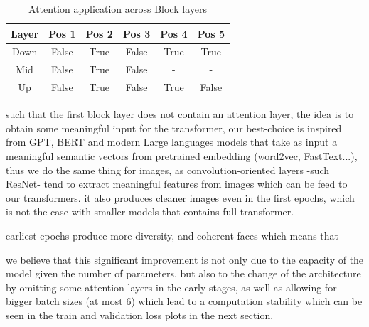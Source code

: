 \documentclass[twocolumn,superscriptaddress,aps]{revtex4-1}
\begin{document}
\begin{table}[h!]
\centering
\begin{tabular}{|c|c|c|c|c|c|}
\hline
\textbf{Layer} & \textbf{Pos 1} & \textbf{Pos 2} & \textbf{Pos 3} & \textbf{Pos 4} & \textbf{Pos 5} \\
\hline
Down & False & True & False & True & True \\
Mid  & False & True & False &   -  &  -  \\
Up   & False & True & False & True & False \\
\hline
\end{tabular}
\caption{Attention application across Block layers}
\end{table}
such that the first block layer does not contain an attention layer, the idea is to obtain some meaningful input for the transformer, our best-choice is inspired from GPT, BERT and modern Large languages models that take as input a meaningful semantic vectors from pretrained embedding (word2vec, FastText...), thus we do the same thing for images, as convolution-oriented layers -such ResNet- tend to extract meaningful features from images which can be feed to our transformers.
it also produces cleaner images even in the first epochs, which is not the case with smaller models that contains full transformer.

earliest epochs produce more diversity, and coherent faces which means that

we believe that this significant improvement is not only due to the capacity of the model given the number of parameters, but also to the change of the architecture by omitting some attention layers in the early stages, as well as allowing for bigger batch sizes (at most 6) which lead to a computation stability which can be seen in the train and validation loss plots in the next section.





\end{document}
